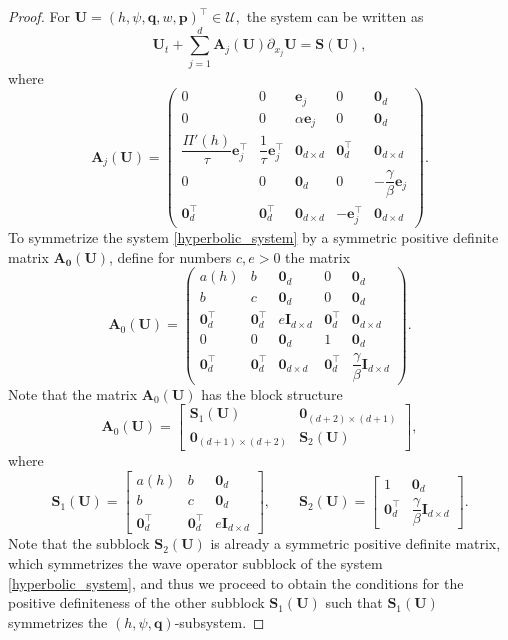 \documentclass[10pt,a4paper]{amsart}
\begin{document}
\begin{proof}
For $\mathbf U
=
\left(h,\psi,\mathbf q,w,\mathbf p\right)^\top\in \mathcal{U},$ the system can be written as
\[
\mathbf U_t
+\sum_{j=1}^d
\mathbf A_j(\mathbf U)\partial_{x_j}\mathbf U
=
\mathbf S(\mathbf U),
\]
where
\[
\mathbf A_j(\mathbf U)
=
\begin{pmatrix}
0&0&\mathbf e_j&0&\mathbf 0_d\\
0&0&\alpha\mathbf e_j&0&\mathbf 0_d\\
\dfrac{\Pi'(h)}{\tau}\mathbf e_j^\top&
\dfrac1\tau\mathbf e_j^\top&
\mathbf 0_{d\times d}&
\mathbf 0_d^\top&
\mathbf 0_{d\times d}\\
0&0&\mathbf 0_d&0&
-\dfrac{\gamma}{\beta}\mathbf e_j\\
\mathbf 0_d^\top&\mathbf 0_d^\top&
\mathbf 0_{d\times d}&
-\mathbf e_j^\top&
\mathbf 0_{d\times d}
\end{pmatrix}.
\]
To symmetrize the system \eqref{hyperbolic_system} by a symmetric positive definite matrix $\mathbf{A_0(U)}$, define for numbers $c, e>0$ the matrix
\[
\mathbf A_0(\mathbf U)
=
\begin{pmatrix}
a(h)&b&\mathbf 0_d&0&\mathbf 0_d\\
b&c&\mathbf 0_d&0&\mathbf 0_d\\
\mathbf 0_d^\top&\mathbf 0_d^\top&
e\mathbf I_{d\times d}&
\mathbf 0_d^\top&\mathbf 0_{d\times d}\\
0&0&\mathbf 0_d&1&\mathbf 0_d\\
\mathbf 0_d^\top&\mathbf 0_d^\top&
\mathbf 0_{d\times d}&
\mathbf 0_d^\top&
\dfrac{\gamma}{\beta}\mathbf I_{d\times d}
\end{pmatrix}.
\]
Note that the matrix $\mathbf A_0(\mathbf U)$ has the block structure
\[
\mathbf A_0(\mathbf U)
=
\begin{bmatrix}
\mathbf S_1(\mathbf U)
&
\mathbf 0_{(d+2)\times(d+1)}
\\
\mathbf 0_{(d+1)\times(d+2)}
&
\mathbf S_2(\mathbf U)
\end{bmatrix},
\]
where
\[
\mathbf S_1(\mathbf U)
=
\begin{bmatrix}
a(h)&b&\mathbf 0_d\\
b&c&\mathbf 0_d\\
\mathbf 0_d^\top&\mathbf 0_d^\top&
e\mathbf I_{d\times d}
\end{bmatrix},
\qquad
\mathbf S_2(\mathbf U)
=
\begin{bmatrix}
1&\mathbf 0_d\\
\mathbf 0_d^\top&
\dfrac{\gamma}{\beta}\mathbf I_{d\times d}
\end{bmatrix}.
\]
Note that the subblock $\mathbf{S}_2(\mathbf{U})$ is already a symmetric positive definite matrix, which symmetrizes the wave operator subblock of the system \eqref{hyperbolic_system}, and thus we proceed to obtain the conditions for the positive definiteness of the other subblock $\mathbf{S}_1(\mathbf{U})$ such that $\mathbf{S}_1(\mathbf{U})$ symmetrizes the $(h,\psi,\mathbf q)$-subsystem.


\end{proof}
\end{document}
